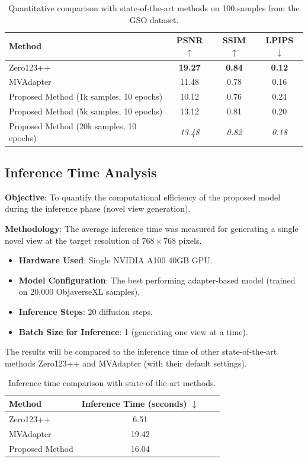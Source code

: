 \begin{table}[htbp]
  \centering
  \caption{Quantitative comparison with state-of-the-art methods on 100 samples from the GSO dataset.}
  \label{tab:sota_comparison_gso}
  \begin{tabular}{lccc}
    \toprule
    \textbf{Method} & \textbf{PSNR} $\uparrow$ & \textbf{SSIM} $\uparrow$ & \textbf{LPIPS} $\downarrow$ \\
    \midrule
    Zero123++ \cite{zero1to3} & \textbf{19.27} & \textbf{0.84} & \textbf{0.12} \\
    MVAdapter \cite{mvadapter} & 11.48 & 0.78 & 0.16 \\
    Proposed Method (1k samples, 10 epochs) & 10.12 & 0.76 & 0.24 \\
    Proposed Method (5k samples, 10 epochs) & 13.12 & 0.81 & 0.20 \\
    Proposed Method (20k samples, 10 epochs) & \textit{13.48} & \textit{0.82} & \textit{0.18} \\
    \bottomrule
  \end{tabular}
\end{table}

\subsection{Inference Time Analysis}\label{ssec:exp_inference_time}
\textbf{Objective}: To quantify the computational efficiency of the proposed model during the inference phase (novel view generation).

\textbf{Methodology}:
The average inference time was measured for generating a single novel view at the target resolution of $768 \times 768$ pixels.
\begin{itemize}
  \item \textbf{Hardware Used}: Single NVIDIA A100 40GB GPU.
  \item \textbf{Model Configuration}: The best performing adapter-based model (trained on 20,000 ObjaverseXL samples).
  \item \textbf{Inference Steps}: 20 diffusion steps.
  \item \textbf{Batch Size for Inference}: 1 (generating one view at a time).
\end{itemize}

The results will be compared to the inference time of other state-of-the-art methods Zero123++ \cite{zero1to3} and MVAdapter \cite{mvadapter} (with their default settings).

\begin{table}[htbp]
  \centering
  \caption{Inference time comparison with state-of-the-art methods.}
  \label{tab:inference_time_comparison}
  \begin{tabular}{lccc}
    \toprule
    \textbf{Method} & \textbf{Inference Time (seconds)} $\downarrow$ \\
    \midrule
    Zero123++ \cite{zero1to3} & 6.51 \\
    MVAdapter \cite{mvadapter} & 19.42 \\
    Proposed Method & 16.04 \\
    \bottomrule
  \end{tabular}
\end{table}

